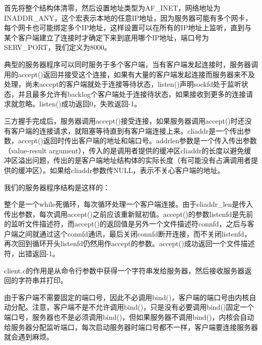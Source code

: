 

首先将整个结构体清零，然后设置地址类型为AF\_\BookSplit{}INET，网络地址为INADDR\_\BookSplit{}ANY，这个宏表示本地的任意IP地址，因为服务器可能有多个网卡，每个网卡也可能绑定多个IP地址，这样设置可以在所有的IP地址上监听，直到与某个客户端建立了连接时才确定下来到底用哪个IP地址，端口号为SERV\_\BookSplit{}PORT，我们定义为8000。




典型的服务器程序可以同时服务于多个客户端，当有客户端发起连接时，服务器调用的accept()返回并接受这个连接，如果有大量的客户端发起连接而服务器来不及处理，尚未accept的客户端就处于连接等待状态，listen()声明sockfd处于监听状态，并且最多允许有backlog个客户端处于连接待状态，如果接收到更多的连接请求就忽略。listen()成功返回0，失败返回-1。




三方握手完成后，服务器调用accept()接受连接，如果服务器调用accept()时还没有客户端的连接请求，就阻塞等待直到有客户端连接上来。cliaddr是一个传出参数，accept()返回时传出客户端的地址和端口号。addrlen参数是一个传入传出参数（value-result argument），传入的是调用者提供的缓冲区cliaddr的长度以避免缓冲区溢出问题，传出的是客户端地址结构体的实际长度（有可能没有占满调用者提供的缓冲区）。如果给cliaddr参数传NULL，表示不关心客户端的地址。



我们的服务器程序结构是这样的：




整个是一个while死循环，每次循环处理一个客户端连接。由于cliaddr\_\BookSplit{}len是传入传出参数，每次调用accept()之前应该重新赋初值。accept()的参数listenfd是先前的监听文件描述符，而accept()的返回值是另外一个文件描述符connfd，之后与客户端之间就通过这个connfd通讯，最后关闭connfd断开连接，而不关闭listenfd，再次回到循环开头listenfd仍然用作accept的参数。accept()成功返回一个文件描述符，出错返回-1。



client.\BookSplit{}c的作用是从命令行参数中获得一个字符串发给服务器，然后接收服务器返回的字符串并打印。




由于客户端不需要固定的端口号，因此不必调用bind()，客户端的端口号由内核自动分配。注意，客户端不是不允许调用bind()，只是没有必要调用bind()固定一个端口号，服务器也不是必须调用bind()，但如果服务器不调用bind()，内核会自动给服务器分配监听端口，每次启动服务器时端口号都不一样，客户端要连接服务器就会遇到麻烦。


